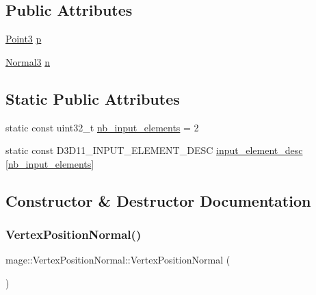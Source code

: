 \subsection*{Public Attributes}
\begin{DoxyCompactItemize}
\item 
\hyperlink{structmage_1_1_point3}{Point3} \hyperlink{structmage_1_1_vertex_position_normal_ac95e9941363ec5687f0bf21e59b83940}{p}
\item 
\hyperlink{structmage_1_1_normal3}{Normal3} \hyperlink{structmage_1_1_vertex_position_normal_a09baa618081e66e21cdfe5752dbf8df6}{n}
\end{DoxyCompactItemize}
\subsection*{Static Public Attributes}
\begin{DoxyCompactItemize}
\item 
static const uint32\+\_\+t \hyperlink{structmage_1_1_vertex_position_normal_a7ccf8843b44100cfdd8ad9bc30228f94}{nb\+\_\+input\+\_\+elements} = 2
\item 
static const D3\+D11\+\_\+\+I\+N\+P\+U\+T\+\_\+\+E\+L\+E\+M\+E\+N\+T\+\_\+\+D\+E\+SC \hyperlink{structmage_1_1_vertex_position_normal_ab4765069df93930c4fecc0029503061e}{input\+\_\+element\+\_\+desc} \mbox{[}\hyperlink{structmage_1_1_vertex_position_normal_a7ccf8843b44100cfdd8ad9bc30228f94}{nb\+\_\+input\+\_\+elements}\mbox{]}
\end{DoxyCompactItemize}


\subsection{Constructor \& Destructor Documentation}
\hypertarget{structmage_1_1_vertex_position_normal_a470e35daf194befbf45ac3ecfd6848e3}{}\label{structmage_1_1_vertex_position_normal_a470e35daf194befbf45ac3ecfd6848e3} 
\subsubsection{\texorpdfstring{Vertex\+Position\+Normal()}{VertexPositionNormal()}\hspace{0.1cm}{\footnotesize\ttfamily [1/4]}}
{\footnotesize\ttfamily mage\+::\+Vertex\+Position\+Normal\+::\+Vertex\+Position\+Normal (\begin{DoxyParamCaption}{ }\end{DoxyParamCaption})\hspace{0.3cm}{\ttfamily [default]}}

